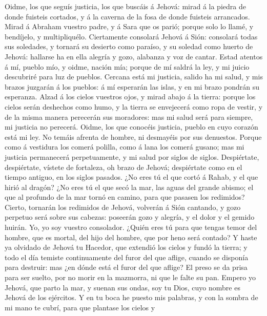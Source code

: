  Oidme, los que seguís justicia, los que buscáis á Jehová:
mirad á la piedra de donde fuisteis cortados, y á la caverna de la fosa
de donde fuisteis arrancados.  Mirad á Abraham vuestro
padre, y á Sara que os parió; porque solo lo llamé, y bendíjelo, y
multipliquélo.  Ciertamente consolará Jehová á Sión:
consolará todas sus soledades, y tornará su desierto como paraíso, y su
soledad como huerto de Jehová: hallarse ha en ella alegría y gozo,
alabanza y voz de cantar.  Estad atentos á mí, pueblo mío, y
oidme, nación mía; porque de mí saldrá la ley, y mi juicio descubriré
para luz de pueblos.  Cercana está mi justicia, salido ha mi
salud, y mis brazos juzgarán á los pueblos: á mí esperarán las islas, y
en mi brazo pondrán su esperanza.  Alzad á los cielos
vuestros ojos, y mirad abajo á la tierra: porque los cielos serán
deshechos como humo, y la tierra se envejecerá como ropa de vestir, y de
la misma manera perecerán sus moradores: mas mi salud será para siempre,
mi justicia no perecerá.  Oidme, los que conocéis justicia,
pueblo en cuyo corazón está mi ley. No temáis afrenta de hombre, ni
desmayéis por sus denuestos.  Porque como á vestidura los
comerá polilla, como á lana los comerá gusano; mas mi justicia
permanecerá perpetuamente, y mi salud por siglos de siglos. 
Despiértate, despiértate, vístete de fortaleza, oh brazo de Jehová;
despiértate como en el tiempo antiguo, en los siglos pasados. ¿No eres
tú el que cortó á Rahab, y el que hirió al dragón?  ¿No
eres tú el que secó la mar, las aguas del grande abismo; el que al
profundo de la mar tornó en camino, para que pasasen los redimidos?
 Cierto, tornarán los redimidos de Jehová, volverán á Sión
cantando, y gozo perpetuo será sobre sus cabezas: poseerán gozo y
alegría, y el dolor y el gemido huirán.  Yo, yo soy vuestro
consolador. ¿Quién eres tú para que tengas temor del hombre, que es
mortal, del hijo del hombre, que por heno será contado?  Y
haste ya olvidado de Jehová tu Hacedor, que extendió los cielos y fundó
la tierra; y todo el día temiste continuamente del furor del que aflige,
cuando se disponía para destruir: mas ¿en dónde está el furor del que
aflige?  El preso se da prisa para ser suelto, por no morir
en la mazmorra, ni que le falte su pan.  Empero yo Jehová,
que parto la mar, y suenan sus ondas, soy tu Dios, cuyo nombre es Jehová
de los ejércitos.  Y en tu boca he puesto mis palabras, y
con la sombra de mi mano te cubrí, para que plantase los cielos y

